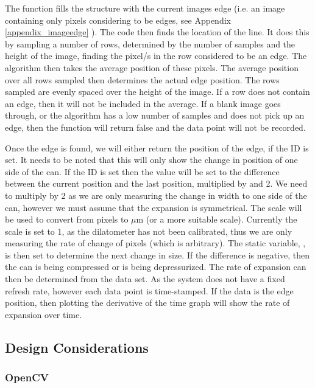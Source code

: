 The  function fills the   structure with the current images edge (i.e. an image containing only pixels considering to be edges, see Appendix \ref{appendix_imageedge} ). The code then finds the location of the line.  It does this by sampling a number of rows, determined by the number of samples and the height of the image, finding the pixel/s in the row considered to be an edge.  The algorithm then takes the average position of these pixels.  The average position over all rows sampled then determines the actual edge position.  The rows sampled are evenly spaced over the height of the image.  If a row does not contain an edge, then it will not be included in the average.  If a blank image goes through, or the algorithm has a low number of samples and does not pick up an edge, then the function will return false and the data point will not be recorded.

Once the edge is found, we will either return the position of the edge, if the  ID is set. It needs to be noted that this will only show the change in position of one side of the can.  If the  ID is set then the value will be set to the difference between the current position and the last position, multiplied by  and 2.  We need to multiply by 2 as we are only measuring the change in width to one side of the can, however we must assume that the expansion is symmetrical.  The scale will be used to convert from pixels to $\mu$m (or a more suitable scale).  Currently the scale is set to 1, as the dilatometer has not been calibrated, thus we are only measuring the rate of change of pixels (which is arbitrary). The static variable, , is then set to determine the next change in size.  If the difference is negative, then the can is being compressed or is being depressurized. 
The rate of expansion can then be determined from the data set.  As the system does not have a fixed refresh rate, however each data point is time-stamped.  If the data is the edge position, then plotting the derivative of the time graph will show the rate of expansion over time.

\subsection{Design Considerations}

\subsubsection{OpenCV}


